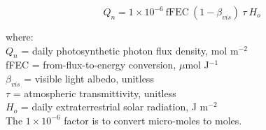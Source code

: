 \begin{equation}
\label{eq:dayppfd}
	Q_n = 1 \times 10^{-6}\: \text{fFEC}\: 
	\left(1-\beta_{vis}\right)\: \tau\: H_o
\end{equation}

\noindent where: \\
\indent $Q_n$ = daily photosynthetic photon flux density, mol m$^{-2}$\\
\indent fFEC = from-flux-to-energy conversion, $\mu$mol J$^{-1}$\\
\indent $\beta_{vis}$ = visible light albedo, unitless \\
\indent $\tau$ = atmospheric transmittivity, unitless \\
\indent $H_o$ = daily extraterrestrial solar radiation, J m$^{-2}$\\

\noindent The $1\times 10^{-6}$ factor is to convert micro-moles to moles.

